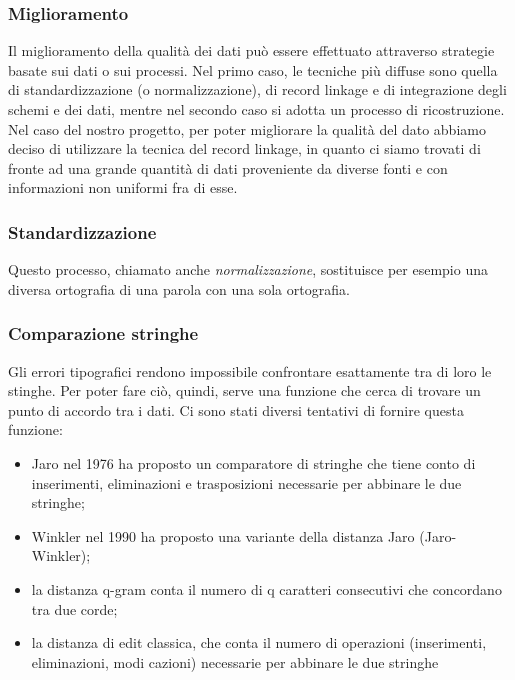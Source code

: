 \documentclass[a4paper,12pt]{article}
\begin{document}
\subsubsection{Miglioramento}

Il miglioramento della qualità dei dati può essere effettuato attraverso strategie basate sui dati o sui processi. Nel primo caso, le tecniche più diffuse sono quella di standardizzazione (o normalizzazione), di record linkage e di integrazione degli schemi e dei dati, mentre nel secondo caso si adotta un processo di ricostruzione. Nel caso del nostro progetto, per poter migliorare la qualità del dato abbiamo deciso di utilizzare la tecnica del record linkage, in quanto ci siamo trovati di fronte ad una grande quantità di dati proveniente da diverse fonti e con informazioni non uniformi fra di esse.

\subsubsection{Standardizzazione}

Questo processo, chiamato anche \textit{normalizzazione}, sostituisce per esempio una diversa ortografia di una parola con una sola ortografia. %

\subsubsection{Comparazione stringhe}

Gli errori tipografici rendono impossibile confrontare esattamente tra di loro le stinghe.  Per poter fare ciò, quindi, serve una funzione che cerca di trovare un punto di accordo tra i dati. Ci sono stati diversi tentativi di fornire questa funzione:

\begin{itemize}
\item Jaro \cite{census/jaro76} nel 1976 ha proposto un comparatore di stringhe che tiene conto di inserimenti, eliminazioni e trasposizioni necessarie per abbinare le due stringhe;
\item Winkler \cite{winkler90} nel 1990 ha proposto una variante della distanza Jaro (Jaro-Winkler);
\item la distanza q-gram conta il numero di q caratteri consecutivi che concordano tra due corde;
\item la distanza di edit classica, che conta il numero di operazioni (inserimenti, eliminazioni, modi cazioni) necessarie per abbinare le due stringhe
\end{itemize}
\end{document}

